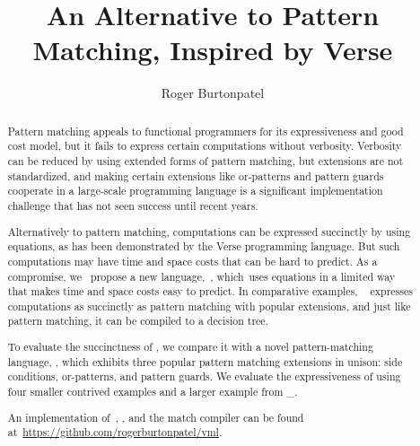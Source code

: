 \documentclass[article,screen,12pt, nonacm]{acmart}
\begin{document}
\title{An Alternative to Pattern Matching, Inspired by Verse}
\author{Roger Burtonpatel}





\renewcommand{\shortauthors}{Burtonpatel}

\begin{abstract}
    Pattern matching %
    appeals %
    to functional programmers for its expressiveness and good cost model, 
    but 
    it %
    fails to express %
    certain computations without verbosity. Verbosity %
    can be reduced %
    by using extended forms of pattern matching,
    but extensions %
    are %
    not standardized, and making certain extensions like or-patterns and pattern
    guards cooperate in a large-scale programming language is a significant
    implementation challenge that has not seen success until recent years. 
    
    
    Alternatively to pattern matching, computations can be expressed succinctly
    by using equations, as has been demonstrated by the Verse programming
    language. But such computations may have time and space costs that can be
    hard to predict. 
    As a compromise, 
    we %
    ~propose %
    a new language,~\VMinus, %
    which~uses equations in a limited way that makes time and space costs easy
    to predict. 
    In
    comparative examples,
    \VMinus~ %
    expresses %
    computations as succinctly as pattern matching with popular extensions, and just like pattern matching, it %
    can be compiled %
    to a decision tree. 
    
    To evaluate %
    the succinctness of \VMinus,
    we compare %
    it with a novel pattern-matching language, \PPlus, which exhibits
    three popular pattern matching extensions 
    in unison: side conditions, or-patterns, and pattern guards. 
    We evaluate %
    the expressiveness of \VMinus using four smaller contrived examples 
    and a larger example from \_. 

    An implementation of~\VMinus, \PPlus, and the match compiler can be found
    at~\url{https://github.com/rogerburtonpatel/vml}.
\end{abstract}

\maketitle
\end{document}

